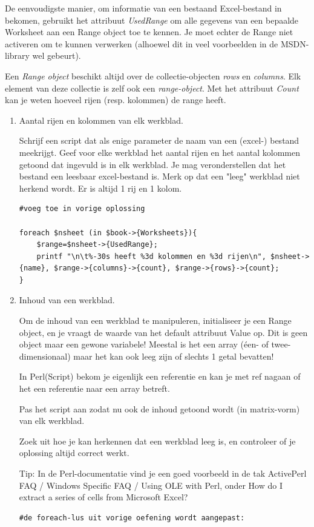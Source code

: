 \documentclass[11pt,a4paper]{report}
\begin{document}
De eenvoudigste manier, om informatie van een bestaand Excel-bestand in bekomen, gebruikt het attribuut \textit{UsedRange} om alle gegevens van een bepaalde Worksheet aan een Range object toe te kennen. Je moet echter de Range niet activeren om te kunnen verwerken (alhoewel dit in veel voorbeelden in de MSDN-library wel gebeurt).
\par Een \textit{Range object} beschikt altijd over de collectie-objecten \textit{rows} en \textit{columns}. Elk element van deze collectie is zelf ook een \textit{range-object}. Met het attribuut \textit{Count} kan je weten hoeveel rijen (resp. kolommen) de range heeft.
\begin{enumerate}[resume]
	\item Aantal rijen en kolommen van elk werkblad. 
	\par Schrijf een script dat als enige parameter de naam van een (excel-) bestand meekrijgt. Geef voor elke werkblad het aantal rijen en het aantal kolommen getoond dat ingevuld is in elk werkblad. Je mag veronderstellen dat het bestand een leesbaar excel-bestand is. 	Merk op dat een "leeg" werkblad niet herkend wordt. Er is altijd 1 rij en 1 kolom.
\begin{lstlisting}
#voeg toe in vorige oplossing

foreach $nsheet (in $book->{Worksheets}){
	$range=$nsheet->{UsedRange};
	printf "\n\t%-30s heeft %3d kolommen en %3d rijen\n", $nsheet->{name}, $range->{columns}->{count}, $range->{rows}->{count};
}
\end{lstlisting}
	\item Inhoud van een werkblad. 
	\par Om de inhoud van een werkblad te manipuleren, initialiseer je een Range object, en je vraagt de waarde van het default attribuut Value op. Dit is geen object maar een gewone variabele! Meestal is het een array (éen- of twee- dimensionaal) maar het kan ook leeg zijn of slechts 1 getal bevatten! 
	\par In Perl(Script) bekom je eigenlijk een referentie en kan je met ref nagaan of het een referentie naar een array betreft.
	\par Pas het script aan zodat nu ook de inhoud getoond wordt (in matrix-vorm) van elk werkblad.
	\par Zoek uit hoe je kan herkennen dat een werkblad leeg is, en controleer of je oplossing altijd correct werkt.
	\par Tip: In de Perl-documentatie vind je een goed voorbeeld in de tak ActivePerl FAQ / Windows Specific FAQ / Using OLE with Perl, onder How do I extract a series of cells from Microsoft Excel?
\begin{lstlisting}
#de foreach-lus uit vorige oefening wordt aangepast:


\end{lstlisting}
\end{enumerate}
\end{document}

